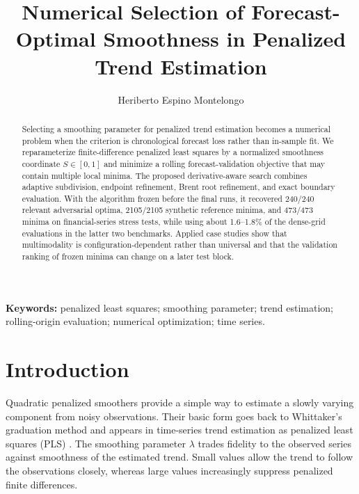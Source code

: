 \documentclass[english]{smcca}
\title{Numerical Selection of Forecast-Optimal Smoothness in Penalized Trend Estimation}
\author[1]{Heriberto Espino Montelongo}
\affil[1]{Universidad de las Am\'ericas Puebla, San Andr\'es Cholula, Puebla, Mexico.}
\date{}
\begin{document}
\maketitle

\begin{abstract}
Selecting a smoothing parameter for penalized trend estimation becomes a numerical problem when the criterion is chronological forecast loss rather than in-sample fit. We reparameterize finite-difference penalized least squares by a normalized smoothness coordinate \(S\in[0,1]\) and minimize a rolling forecast-validation objective that may contain multiple local minima. The proposed derivative-aware search combines adaptive subdivision, endpoint refinement, Brent root refinement, and exact boundary evaluation. With the algorithm frozen before the final runs, it recovered 240/240 relevant adversarial optima, 2105/2105 synthetic reference minima, and 473/473 minima on financial-series stress tests, while using about 1.6--1.8\% of the dense-grid evaluations in the latter two benchmarks. Applied case studies show that multimodality is configuration-dependent rather than universal and that the validation ranking of frozen minima can change on a later test block.
\end{abstract}

\vspace{1em}

\noindent\textbf{Keywords:} penalized least squares; smoothing parameter; trend estimation; rolling-origin evaluation; numerical optimization; time series.

\vspace{10pt}

\section{Introduction}

Quadratic penalized smoothers provide a simple way to estimate a slowly varying component from noisy observations. Their basic form goes back to Whittaker's graduation method \cite{whittaker1923graduation} and appears in time-series trend estimation as penalized least squares (PLS) \cite{guerrero2007penalized}. The smoothing parameter \(\lambda\) trades fidelity to the observed series against smoothness of the estimated trend. Small values allow the trend to follow the observations closely, whereas large values increasingly suppress penalized finite differences.
\end{document}
